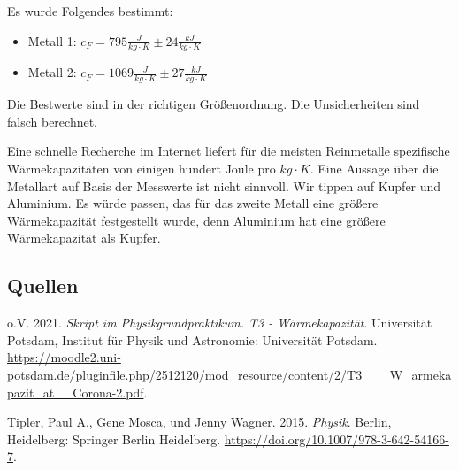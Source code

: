 \documentclass[
  9pt,
]{article}
\newlength{\cslhangindent}
\newlength{\cslentryspacingunit} %
\newenvironment{CSLReferences}[2] %
 {%
  \setlength{\parindent}{0pt}
  \ifodd #1
  \let\oldpar\par
  \def\par{\hangindent=\cslhangindent\oldpar}
  \fi
  \setlength{\parskip}{#2\cslentryspacingunit}
 }%
 {}
\begin{document}
Es wurde Folgendes bestimmt:

\begin{itemize}
  \item Metall 1: $c_F = 795\frac{J}{kg\cdot K}\pm 24\frac{kJ}{kg\cdot K}$
  \item Metall 2: $c_F = 1069\frac{J}{kg\cdot K}\pm 27\frac{kJ}{kg\cdot K}$
\end{itemize}

Die Bestwerte sind in der richtigen Größenordnung. Die Unsicherheiten
sind falsch berechnet.

Eine schnelle Recherche im Internet liefert für die meisten Reinmetalle
spezifische Wärmekapazitäten von einigen hundert Joule pro
\(kg\cdot K\). Eine Aussage über die Metallart auf Basis der Messwerte
ist nicht sinnvoll. Wir tippen auf Kupfer und Aluminium. Es würde
passen, das für das zweite Metall eine größere Wärmekapazität
festgestellt wurde, denn Aluminium hat eine größere Wärmekapazität als
Kupfer.

\hypertarget{quellen}{%
\subsection*{Quellen}\label{quellen}}

\hypertarget{refs}{}
\begin{CSLReferences}{1}{0}
\leavevmode{}%
o.V. 2021. \emph{Skript im Physikgrundpraktikum. T3 - Wärmekapazität}.
Universität Potsdam, Institut für Physik und Astronomie: {Universität
Potsdam}.
\url{https://moodle2.uni-potsdam.de/pluginfile.php/2512120/mod_resource/content/2/T3___W_armekapazit_at__Corona-2.pdf}.

\leavevmode{}%
Tipler, Paul A., Gene Mosca, und Jenny Wagner. 2015. \emph{Physik}.
Berlin, Heidelberg: {Springer Berlin Heidelberg}.
\url{https://doi.org/10.1007/978-3-642-54166-7}.

\end{CSLReferences}
\end{document}
